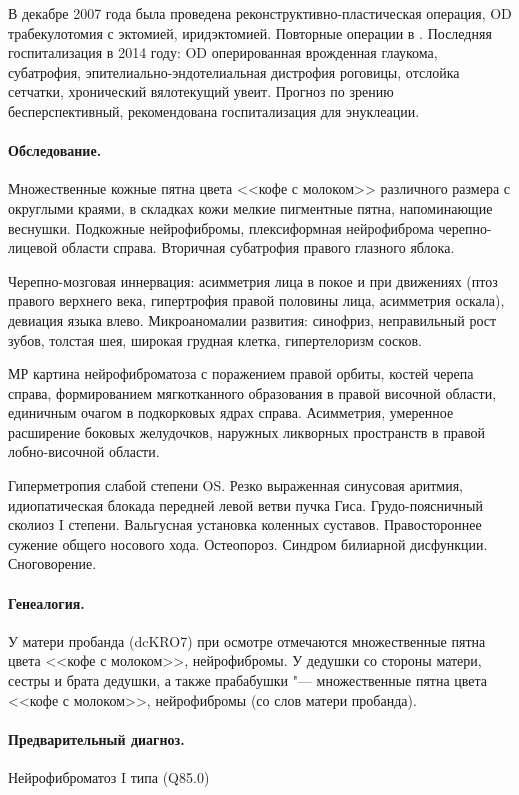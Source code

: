 \documentclass[a4paper,14pt]{extarticle}
\begin{document}
В декабре 2007 года была проведена реконструктивно-пластическая операция, OD трабекулотомия с эктомией, иридэктомией.
Повторные операции в .
Последняя госпитализация в 2014 году: OD оперированная врожденная глаукома, субатрофия, эпителиально-эндотелиальная дистрофия роговицы, отслойка сетчатки, хронический вялотекущий увеит.
Прогноз по зрению бесперспективный, рекомендована госпитализация для энуклеации.

\paragraph{Обследование.}
Множественные кожные пятна цвета <<кофе с молоком>> различного размера с округлыми краями, в складках кожи мелкие пигментные пятна, напоминающие веснушки.
Подкожные нейрофибромы, плексиформная нейрофиброма черепно-лицевой области справа.
Вторичная субатрофия правого глазного яблока.

Черепно-мозговая иннервация: асимметрия лица в покое и при движениях (птоз правого верхнего века, гипертрофия правой половины лица, асимметрия оскала), девиация языка влево.
Микроаномалии развития: синофриз, неправильный рост зубов, толстая шея, широкая грудная клетка, гипертелоризм сосков.

МР картина нейрофиброматоза с поражением правой орбиты, костей черепа справа, формированием мягкотканного образования в правой височной области, единичным очагом в подкорковых ядрах справа.
Асимметрия, умеренное расширение боковых желудочков, наружных ликворных пространств в правой лобно-височной области.

Гиперметропия слабой степени OS.
Резко выраженная синусовая аритмия, идиопатическая блокада передней левой ветви пучка Гиса.
Грудо-поясничный сколиоз I степени.
Вальгусная установка коленных суставов.
Правостороннее сужение общего носового хода.
Остеопороз.
Синдром билиарной дисфункции.
Сноговорение.

\paragraph{Генеалогия.}
У матери пробанда (dcKRO7) при осмотре отмечаются множественные пятна цвета <<кофе с молоком>>, нейрофибромы.
У дедушки со стороны матери, сестры и брата дедушки, а также прабабушки "--- множественные пятна цвета <<кофе с молоком>>, нейрофибромы (со слов матери пробанда).

\paragraph{Предварительный диагноз.}
Нейрофиброматоз I типа (Q85.0)
\end{document}
